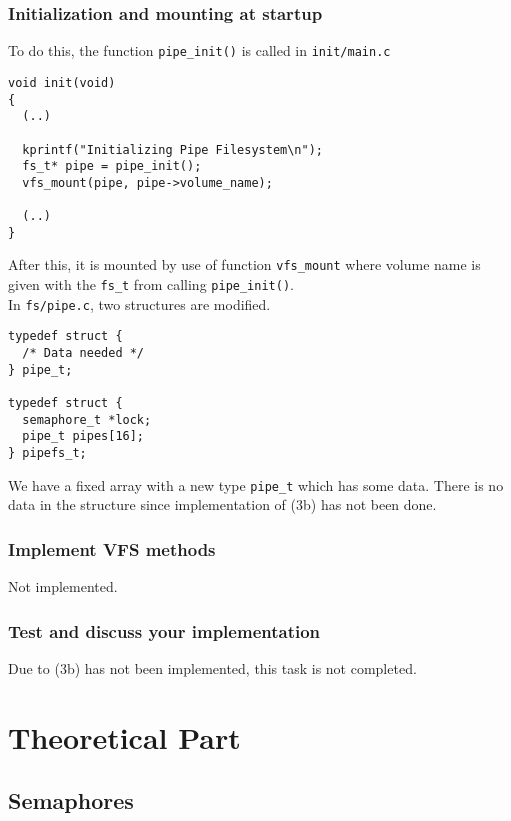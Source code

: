 \documentclass[12pt]{article}
\begin{document}
\subsubsection{Initialization and mounting at startup}
To do this, the function \texttt{pipe\_init()} is called in \texttt{init/main.c}
\begin{verbatim}
void init(void)
{
  (..)
  
  kprintf("Initializing Pipe Filesystem\n");
  fs_t* pipe = pipe_init();
  vfs_mount(pipe, pipe->volume_name);
  
  (..)
}
\end{verbatim}
After this, it is mounted by use of function \texttt{vfs\_mount} where volume name is given with the \texttt{fs\_t} from calling \texttt{pipe\_init()}.\\
In \texttt{fs/pipe.c}, two structures are modified.
\begin{verbatim}
typedef struct {
  /* Data needed */
} pipe_t;

typedef struct {
  semaphore_t *lock;
  pipe_t pipes[16];
} pipefs_t;
\end{verbatim}
We have a fixed array with a new type \texttt{pipe\_t} which has some data. There is no data in the structure since implementation of (3b) has not been done.

\subsubsection{Implement VFS methods}
Not implemented.

\subsubsection{Test and discuss your implementation}
Due to (3b) has not been implemented, this task is not completed.

\newpage

\section{Theoretical Part}
\subsection{Semaphores}
\end{document}
